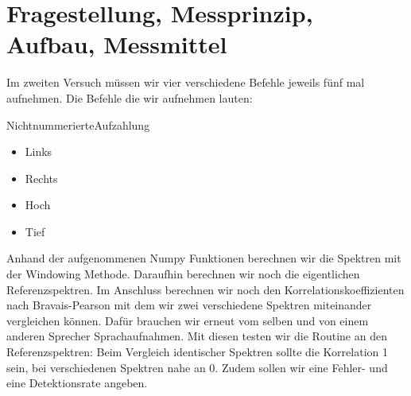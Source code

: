 \documentclass[12pt, oneside, a4paper, \docLanguage]{report}
\begin{document}
\section{Fragestellung, Messprinzip, Aufbau, Messmittel}
\label{chap:VERSUCH_2_FRAGESTELLUNG}
Im zweiten Versuch müssen wir vier verschiedene Befehle jeweils fünf mal aufnehmen. 
\newline
Die Befehle die wir aufnehmen lauten:
\item[NichtnummerierteAufzahlung]~\par
   \begin{itemize}
      \item Links
      \item Rechts
      \item Hoch
      \item Tief
   \end{itemize}
Anhand der aufgenommenen Numpy Funktionen berechnen wir die Spektren mit der Windowing Methode.
Daraufhin berechnen wir noch die eigentlichen Referenzspektren.
\newline
Im Anschluss berechnen wir noch den Korrelationskoeffizienten nach Bravais-Pearson mit dem wir zwei verschiedene Spektren miteinander vergleichen können.
\newline
Dafür brauchen wir erneut vom selben und von einem anderen Sprecher Sprachaufnahmen.
\newline
Mit diesen testen wir die Routine an den Referenzspektren: 
\newline
Beim Vergleich identischer Spektren sollte die Korrelation 1 sein, bei verschiedenen Spektren nahe an 0.
\newline
Zudem sollen wir eine Fehler- und eine Detektionsrate angeben.
\end{document}
